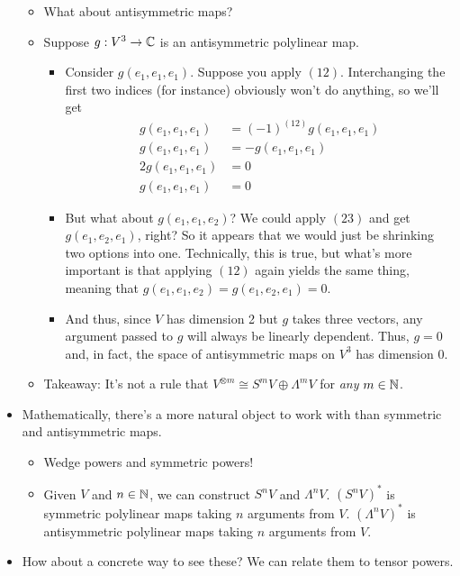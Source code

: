 \documentclass[../notes.tex]{subfiles}
\begin{document}
\begin{itemize}
\begin{itemize}
        \item What about antisymmetric maps?
        \item Suppose $g:V^3\to\mathbb{C}$ is an antisymmetric polylinear map.
        \begin{itemize}
            \item Consider $g(e_1,e_1,e_1)$. Suppose you apply $(12)$. Interchanging the first two indices (for instance) obviously won't do anything, so we'll get
            \begin{align*}
                g(e_1,e_1,e_1) &= (-1)^{(12)}g(e_1,e_1,e_1)\\
                g(e_1,e_1,e_1) &= -g(e_1,e_1,e_1)\\
                2g(e_1,e_1,e_1) &= 0\\
                g(e_1,e_1,e_1) &= 0
            \end{align*}
            \item But what about $g(e_1,e_1,e_2)$? We could apply $(23)$ and get $g(e_1,e_2,e_1)$, right? So it appears that we would just be shrinking two options into one. Technically, this is true, but what's more important is that applying $(12)$ again yields the same thing, meaning that $g(e_1,e_1,e_2)=g(e_1,e_2,e_1)=0$.
            \item And thus, since $V$ has dimension 2 but $g$ takes three vectors, any argument passed to $g$ will always be linearly dependent. Thus, $g=0$ and, in fact, the space of antisymmetric maps on $V^3$ has dimension 0.
        \end{itemize}
        \item Takeaway: It's not a rule that $V^{\otimes m}\cong S^mV\oplus\Lambda^mV$ for \emph{any} $m\in\mathbb{N}$.
    \end{itemize}
    \item Mathematically, there's a more natural object to work with than symmetric and antisymmetric maps.
    \begin{itemize}
        \item Wedge powers and symmetric powers!
        \item Given $V$ and $n\in\mathbb{N}$, we can construct $S^nV$ and $\Lambda^nV$. $(S^nV)^*$ is symmetric polylinear maps taking $n$ arguments from $V$. $(\Lambda^nV)^*$ is antisymmetric polylinear maps taking $n$ arguments from $V$.
    \end{itemize}
    \item How about a concrete way to see these? We can relate them to tensor powers.
    \begin{itemize}

\end{itemize}
\end{itemize}
\end{document}
